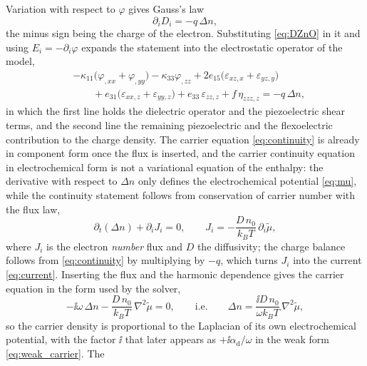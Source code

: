 Variation with respect to $\varphi$ gives Gauss's law
\begin{equation}
\label{eq:gauss}
\partial_iD_i=-q\,\Delta n,
\end{equation}
the minus sign being the charge of the electron.  Substituting
\eqref{eq:DZnO} in it and using $E_i=-\partial_i\varphi$ expands the statement
into the electrostatic operator of the model,
\begin{equation}
\label{eq:gauss_expanded}
\begin{aligned}
&-\kappa_{11}\bigl(\varphi_{,xx}+\varphi_{,yy}\bigr)
-\kappa_{33}\varphi_{,zz}
+2e_{15}\bigl(\varepsilon_{xz,x}+\varepsilon_{yz,y}\bigr)\\
&\qquad
+e_{31}\bigl(\varepsilon_{xx,z}+\varepsilon_{yy,z}\bigr)
+e_{33}\,\varepsilon_{zz,z}
+f\,\eta_{zzz,z}
=-q\,\Delta n ,
\end{aligned}
\end{equation}
in which the first line holds the dielectric operator and the piezoelectric shear terms, and the second line the remaining piezoelectric and the flexoelectric
contribution to the charge density.  The
carrier equation \eqref{eq:continuity} is already in component form once the flux
is inserted, and the carrier continuity equation in electrochemical form is not a variational
equation of the enthalpy: the derivative with respect to $\Delta n$ only defines the
electrochemical potential \eqref{eq:mu}, while the continuity statement
follows from conservation of carrier number with the flux law,
\begin{equation}
\label{eq:continuity}
\partial_t(\Delta n)+\partial_iJ_i=0,
\qquad
J_i=-\frac{D\,n_0}{k_BT}\,\partial_i\widetilde\mu ,
\end{equation}
where $J_i$ is the electron \emph{number} flux and $D$ the diffusivity; the
charge balance follows from \eqref{eq:continuity} by multiplying by $-q$, which
turns $J_i$ into the current \eqref{eq:current}.  Inserting the flux and the
harmonic dependence gives the carrier equation in the form used by the solver,
\begin{equation}
\label{eq:carrier_strong}
-\ii\omega\,\Delta n-\frac{D\,n_0}{k_BT}\,\nabla^{2}\widetilde\mu=0 ,
\qquad\text{i.e.}\qquad
\Delta n=\frac{\ii D\,n_0}{\omega k_BT}\,\nabla^{2}\widetilde\mu ,
\end{equation}
so the carrier density is proportional to the Laplacian of its own
electrochemical potential, with the factor $\ii$ that later appears as
$+\ii\alpha_{\mathrm d}/\omega$ in the weak form \eqref{eq:weak_carrier}.  The
